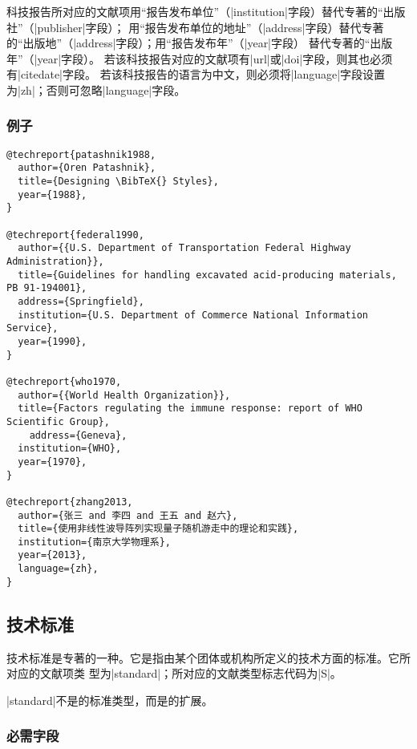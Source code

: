 \begin{note}
科技报告所对应的文献项用“报告发布单位”（|institution|字段）替代专著的“出版社”（|publisher|字段）；
用“报告发布单位的地址”（|address|字段）替代专著的“出版地”（|address|字段）；用“报告发布年”（|year|字段）
替代专著的“出版年”（|year|字段）。
若该科技报告对应的文献项有|url|或|doi|字段，则其也必须有|citedate|字段。
若该科技报告的语言为中文，则必须将|language|字段设置为|zh|；否则可忽略|language|字段。
\end{note}

\subsubsection{例子}

\begin{verbatim}
@techreport{patashnik1988,
  author={Oren Patashnik},
  title={Designing \BibTeX{} Styles},
  year={1988},
}

@techreport{federal1990,
  author={{U.S. Department of Transportation Federal Highway Administration}},
  title={Guidelines for handling excavated acid-producing materials, PB 91-194001},
  address={Springfield},
  institution={U.S. Department of Commerce National Information Service},
  year={1990},
}

@techreport{who1970,
  author={{World Health Organization}},
  title={Factors regulating the immune response: report of WHO Scientific Group},
    address={Geneva},
  institution={WHO},
  year={1970},
}

@techreport{zhang2013,
  author={张三 and 李四 and 王五 and 赵六},
  title={使用非线性波导阵列实现量子随机游走中的理论和实践},
  institution={南京大学物理系},
  year={2013},
  language={zh},
}
\end{verbatim}


\subsection{技术标准}\label{subsec:bibtype-standard}

技术标准是专著的一种。它是指由某个团体或机构所定义的技术方面的标准。它所对应的{\BibTeX}文献项类
型为|standard|；所对应的文献类型标志代码为|S|\cite{gbt3469-1983}。

|standard|不是{\BibTeX}的标准类型，而是{\njuthesis}的扩展。

\subsubsection{必需字段}

